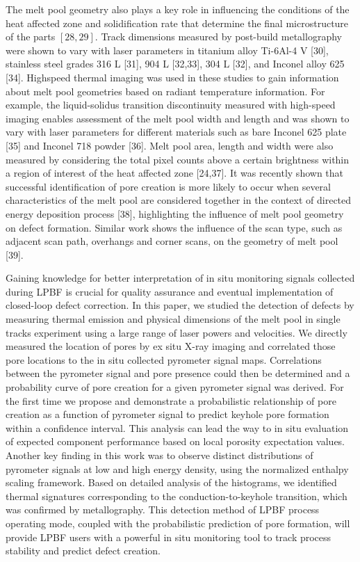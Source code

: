 \documentclass[10pt]{article}
\begin{document}
The melt pool geometry also plays a key role in influencing the conditions of the heat affected zone and solidification rate that determine the final microstructure of the parts $[28,29]$. Track dimensions measured by post-build metallography were shown to vary with laser parameters in titanium alloy Ti-6Al-4 V [30], stainless steel grades 316 L [31], 904 L [32,33], 304 L [32], and Inconel alloy 625 [34]. Highspeed thermal imaging was used in these studies to gain information about melt pool geometries based on radiant temperature information. For example, the liquid-solidus transition discontinuity measured with high-speed imaging enables assessment of the melt pool width and length and was shown to vary with laser parameters for different materials such as bare Inconel 625 plate [35] and Inconel 718 powder [36]. Melt pool area, length and width were also measured by considering the total pixel counts above a certain brightness within a region of interest of the heat affected zone [24,37]. It was recently shown that successful identification of pore creation is more likely to occur when several characteristics of the melt pool are considered together in the context of directed energy deposition process [38], highlighting the influence of melt pool geometry on defect formation. Similar work shows the influence of the scan type, such as adjacent scan path, overhangs and corner scans, on the geometry of melt pool [39].

Gaining knowledge for better interpretation of in situ monitoring signals collected during LPBF is crucial for quality assurance and eventual implementation of closed-loop defect correction. In this paper, we studied the detection of defects by measuring thermal emission and physical dimensions of the melt pool in single tracks experiment using a large range of laser powers and velocities. We directly measured the location of pores by ex situ X-ray imaging and correlated those pore locations to the in situ collected pyrometer signal maps. Correlations between the pyrometer signal and pore presence could then be determined and a probability curve of pore creation for a given pyrometer signal was derived. For the first time we propose and demonstrate a probabilistic relationship of pore creation as a function of pyrometer signal to predict keyhole pore formation within a confidence interval. This analysis can lead the way to in situ evaluation of expected component performance based on local porosity expectation values. Another key finding in this work was to observe distinct distributions of pyrometer signals at low and high energy density, using the normalized enthalpy scaling framework. Based on detailed analysis of the histograms, we identified thermal signatures corresponding to the conduction-to-keyhole transition, which was confirmed by metallography. This detection method of LPBF process operating mode, coupled with the probabilistic prediction of pore formation, will provide LPBF users with a powerful in situ monitoring tool to track process stability and predict defect creation.
\end{document}
